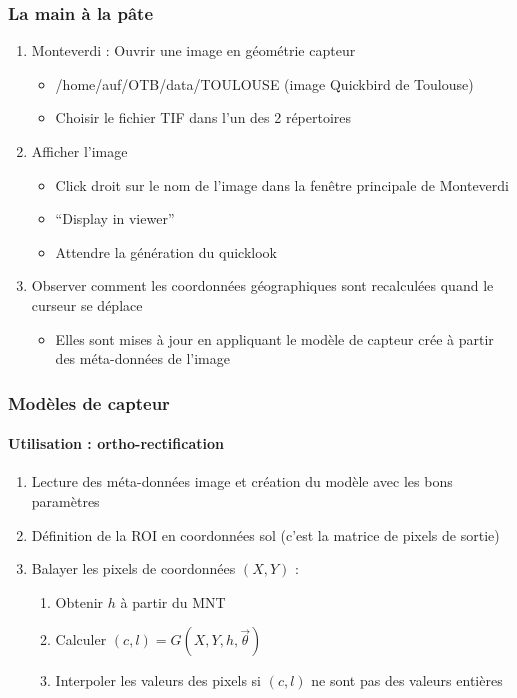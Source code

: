 \documentclass[compress]{beamer}
\begin{document}
\begin{frame}
\frametitle{La main à la pâte}
\begin{enumerate}
\item Monteverdi : Ouvrir une image en géométrie capteur
  \begin{itemize}
  \item /home/auf/OTB/data/TOULOUSE (image Quickbird de Toulouse)
  \item Choisir le fichier TIF dans l'un des 2 répertoires
  \end{itemize}
\item Afficher l'image
  \begin{itemize}
  \item Click droit sur le nom de l'image dans la fenêtre principale
    de Monteverdi
  \item ``Display in viewer''
  \item Attendre la génération du quicklook
  \end{itemize}
\item Observer comment les coordonnées géographiques sont recalculées
  quand le curseur se déplace
  \begin{itemize}
  \item Elles sont mises à jour en appliquant le modèle de capteur
    crée à partir des méta-données de l'image
  \end{itemize}
\end{enumerate}
\end{frame}

\begin{frame}
  \frametitle{Modèles de capteur}

  \framesubtitle{Utilisation : ortho-rectification}
  \begin{enumerate}
    \item Lecture des méta-données image et création du modèle avec
      les bons paramètres
  \item Définition de la ROI en coordonnées sol (c'est la matrice de
    pixels de sortie)
  \item Balayer les pixels de coordonnées $(X,Y)$ :
    \begin{enumerate}
      \item Obtenir $h$ à partir du MNT
      \item Calculer $(c,l) = G(X,Y,h,\vec\theta)$
      \item Interpoler les valeurs des pixels si $(c,l)$ ne sont pas
        des valeurs entières
    \end{enumerate}
  \end{enumerate}
\end{frame}
\end{document}
